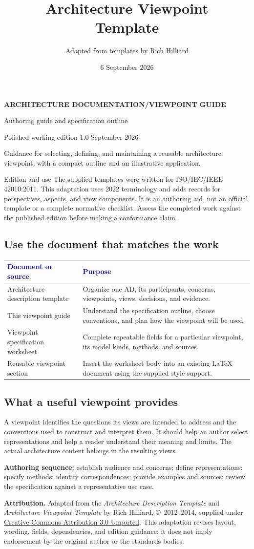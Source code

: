 \documentclass[11pt,letterpaper]{article}
\title{Architecture Viewpoint\\Template}
\author{Adapted from templates by Rich Hilliard}
\date{6 September 2026}
\makeatletter
\newcommand{\TableHead}[1]{\textcolor{Navy}{\sffamily\bfseries#1}}
\newcommand{\Lead}[1]{\textcolor{Muted}{#1}\par\vspace{3pt}}
\newcommand{\TemplateTitle}[3]{%
  {\sffamily\small\bfseries\color{Teal}ARCHITECTURE DOCUMENTATION\enspace /\enspace #1\par}
  \vspace{14pt}
  {\sffamily\bfseries\fontsize{29}{33}\selectfont\color{Navy}#2\par}
  \vspace{10pt}
  {\sffamily\large\color{Muted}#3\par}
  \vspace{11pt}
  {\sffamily\small\color{Muted}Polished working edition 1.0\enspace\textbullet\enspace 6 September 2026\par}
  \vspace{13pt}{\color{Teal}\hrule height 1.2pt}\vspace{9pt}}
\newcommand{\TemplateAttribution}{%
  \textbf{Attribution.} Adapted from the \emph{Architecture Description Template}
  and \emph{Architecture Viewpoint Template} by Rich Hilliard,
  \copyright\ 2012--2014, supplied under
  \href{https://creativecommons.org/licenses/by/3.0/}{Creative Commons Attribution 3.0 Unported}.
  This adaptation revises layout, wording, fields, dependencies, and edition guidance;
  it does not imply endorsement by the original author or the standards bodies.}
\newcommand{\EditionNote}{%
  The supplied templates were written for ISO/IEC/IEEE 42010:2011.
  This adaptation uses 2022 terminology and adds records for perspectives,
  aspects, and view components. It is an authoring aid, not an official template
  or a complete normative checklist. Assess the completed work against the
  published edition before making a conformance claim.}
\renewcommand{\maketitle}{\TemplateTitle{VIEWPOINT GUIDE}{\@title}{Authoring guide and specification outline}}
\makeatother
\begin{document}
\maketitle
\Lead{Guidance for selecting, defining, and maintaining a reusable architecture
viewpoint, with a compact outline and an illustrative application.}

\begin{TemplateNote}{Edition and use}
\EditionNote
\end{TemplateNote}

\subsection{Use the document that matches the work}
{\small
\begin{tabularx}{\linewidth}{@{}L{1.7in}Y@{}}
\toprule
\TableHead{Document or source} & \TableHead{Purpose}\\
\midrule
Architecture description template & Organize one AD, its participants, concerns,
viewpoints, views, decisions, and evidence.\\
This viewpoint guide & Understand the specification outline, choose conventions,
and plan how the viewpoint will be used.\\
Viewpoint specification worksheet & Complete repeatable fields for a particular
viewpoint, its model kinds, methods, and sources.\\
Reusable viewpoint section & Insert the worksheet body into an existing LaTeX
document using the supplied style support.\\
\bottomrule
\end{tabularx}}

\subsection{What a useful viewpoint provides}
A viewpoint identifies the questions its views are intended to address and
the conventions used to construct and interpret them. It should help an author
select representations and help a reader understand their meaning and limits.
The actual architecture content belongs in the resulting views.

\textbf{Authoring sequence:} establish audience and concerns; define
representations; specify methods; identify correspondences; provide examples
and sources; review the specification against a representative use case.

\vfill
{\footnotesize\color{Muted}\TemplateAttribution\par}
\end{document}
